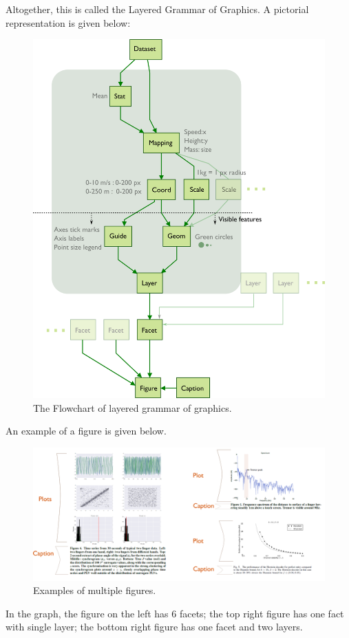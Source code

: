\documentclass[a4paper, openany]{memoir}
\begin{document}
\noindent Altogether, this is called the Layered Grammar of Graphics. A pictorial representation is given below:
\begin{figure}[H]
    \centering
    \includegraphics[scale=0.55]{src/2.1 grammar of graphics.png}
    \caption{The Flowchart of layered grammar of graphics.}
\end{figure}
\newpage

An example of a figure is given below.
\begin{figure}[H]
    \centering
    \includegraphics[scale=0.25]{src/2.2 figure examples.png}
    \caption{Examples of multiple figures.}
\end{figure}
\noindent In the graph, the figure on the left has 6 facets; the top right figure has one fact with single layer; the bottom right figure has one facet and two layers.
\end{document}
